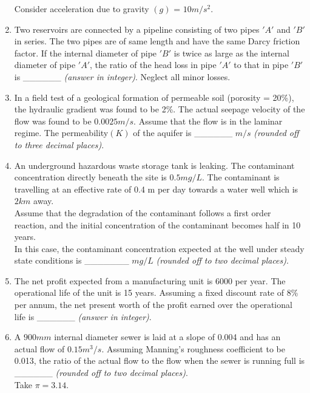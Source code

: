 \documentclass[journal]{IEEEtran}
\begin{document}
\begin{enumerate}[start=1]
Consider acceleration due to gravity $(g)$ = $10 m/s^2$. \hfill{}

\item Two reservoirs are connected by a pipeline consisting of two pipes $'A'$ and $'B'$ in series. The two pipes are of same length and have the same Darcy friction factor. If the internal diameter of pipe $'B'$ is twice as large as the internal diameter of pipe $'A'$, the ratio of the head loss in pipe $'A'$ to that in pipe $'B'$ is \_\_\_\_\_\_ \textit{(answer in integer)}. Neglect all minor losses. \hfill{}

\item In a field test of a geological formation of permeable soil (porosity = 20\%), the hydraulic gradient was found to be 2\%. The actual seepage velocity of the flow was found to be $0.0025 m/s$. Assume that the flow is in the laminar regime. The permeability$(K)$ of the aquifer is \_\_\_\_\_\_ $m/s$ \textit{(rounded off to three decimal places)}. \hfill{}

\item An underground hazardous waste storage tank is leaking. The contaminant concentration directly beneath the site is $0.5 mg/L$. The contaminant is travelling at an effective rate of 0.4 m per day towards a water well which is $2 km$ away.\\
Assume that the degradation of the contaminant follows a first order reaction, and the initial concentration of the contaminant becomes half in 10 years.\\
In this case, the contaminant concentration expected at the well under steady state conditions is \_\_\_\_\_\_\_ $mg/L$ \textit{(rounded off to two decimal places)}. \hfill{}

\item The net profit expected from a manufacturing unit is \rupee $6000$ per year. The operational life of the unit is 15 years. Assuming a fixed discount rate of 8\% per annum, the net present worth of the profit earned over the operational life is \rupee \_\_\_\_\_\_ \textit{(answer in integer)}. \hfill{}

\item A $900 mm$ internal diameter sewer is laid at a slope of 0.004 and has an actual flow of $ 0.15 m^3/s$. Assuming Manning's roughness coefficient to be 0.013, the ratio of the actual flow to the flow when the sewer is running full is \_\_\_\_\_\_ \textit{(rounded off to two decimal places)}.\\
Take $\pi=3.14$. \hfill{}


\end{enumerate}
\end{document}
